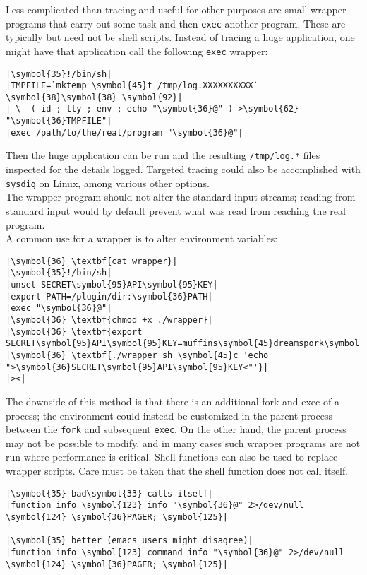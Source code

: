 \documentclass[10pt,a4paper]{article}
\begin{document}
Less complicated than tracing and useful for other purposes are small
wrapper programs that carry out some task and then \texttt{exec} another
program. These are typically but need not be shell scripts. Instead of
tracing a huge application, one might have that application call the
following \texttt{exec} wrapper:

\begin{lstlisting}
|\symbol{35}!/bin/sh|
|TMPFILE=`mktemp \symbol{45}t /tmp/log.XXXXXXXXXX` \symbol{38}\symbol{38} \symbol{92}|
| \  ( id ; tty ; env ; echo "\symbol{36}@" ) >\symbol{62} "\symbol{36}TMPFILE"|
|exec /path/to/the/real/program "\symbol{36}@"|
\end{lstlisting}

Then the huge application can be run and the resulting
\texttt{/tmp/log.*} files inspected for the details logged. Targeted
tracing could also be accomplished with \texttt{sysdig} on Linux, among
various other options. \\

The wrapper program should not alter the standard input streams; reading
from standard input would by default prevent what was read from reaching
the real program. \\

A common use for a wrapper is to alter environment variables:

\begin{lstlisting}
|\symbol{36} \textbf{cat wrapper}|
|\symbol{35}!/bin/sh|
|unset SECRET\symbol{95}API\symbol{95}KEY|
|export PATH=/plugin/dir:\symbol{36}PATH|
|exec "\symbol{36}@"|
|\symbol{36} \textbf{chmod +x ./wrapper}|
|\symbol{36} \textbf{export SECRET\symbol{95}API\symbol{95}KEY=muffins\symbol{45}dreamspork\symbol{45}hodgepodge}|
|\symbol{36} \textbf{./wrapper sh \symbol{45}c 'echo ">\symbol{36}SECRET\symbol{95}API\symbol{95}KEY<"'}|
|><|
\end{lstlisting}

The downside of this method is that there is an additional fork and exec
of a process; the environment could instead be customized in the parent
process between the \texttt{fork} and subsequent \texttt{exec}. On the
other hand, the parent process may not be possible to modify, and in
many cases such wrapper programs are not run where performance is
critical. Shell functions can also be used to replace wrapper scripts.
Care must be taken that the shell function does not call itself.

\begin{lstlisting}
|\symbol{35} bad\symbol{33} calls itself|
|function info \symbol{123} info "\symbol{36}@" 2>/dev/null \symbol{124} \symbol{36}PAGER; \symbol{125}|

|\symbol{35} better (emacs users might disagree)|
|function info \symbol{123} command info "\symbol{36}@" 2>/dev/null \symbol{124} \symbol{36}PAGER; \symbol{125}|
\end{lstlisting}
\end{document}
